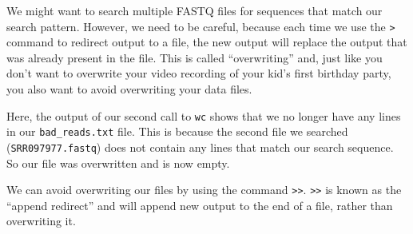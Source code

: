 \documentclass[
  letterpaper,
  DIV=11,
  numbers=noendperiod]{scrreprt}
\newenvironment{Shaded}{\begin{snugshade}}{\end{snugshade}}
\newcommand{\AttributeTok}[1]{\textcolor[rgb]{0.40,0.45,0.13}{#1}}
\newcommand{\ExtensionTok}[1]{\textcolor[rgb]{0.00,0.23,0.31}{#1}}
\newcommand{\NormalTok}[1]{\textcolor[rgb]{0.00,0.23,0.31}{#1}}
\newcommand{\OperatorTok}[1]{\textcolor[rgb]{0.37,0.37,0.37}{#1}}
\begin{document}
We might want to search multiple FASTQ files for sequences that match
our search pattern. However, we need to be careful, because each time we
use the \texttt{\textgreater{}} command to redirect output to a file,
the new output will replace the output that was already present in the
file. This is called ``overwriting'' and, just like you don't want to
overwrite your video recording of your kid's first birthday party, you
also want to avoid overwriting your data files.

\begin{Shaded}
\end{Shaded}

\begin{Shaded}
\end{Shaded}

Here, the output of our second call to \texttt{wc} shows that we no
longer have any lines in our \texttt{bad\_reads.txt} file. This is
because the second file we searched (\texttt{SRR097977.fastq}) does not
contain any lines that match our search sequence. So our file was
overwritten and is now empty.

We can avoid overwriting our files by using the command
\texttt{\textgreater{}\textgreater{}}.
\texttt{\textgreater{}\textgreater{}} is known as the ``append
redirect'' and will append new output to the end of a file, rather than
overwriting it.

\begin{Shaded}
\end{Shaded}
\end{document}
